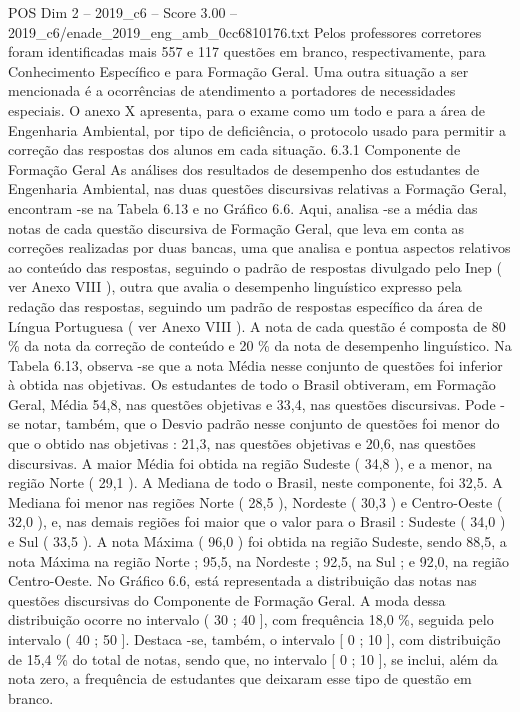 \begin{textsample}{POS Dim 2 – 2019\_c6 – Score 3.00 – 2019\_c6/enade\_2019\_eng\_amb\_0cc6810176.txt}
Pelos professores corretores foram identificadas mais 557 e 117 questões em branco, respectivamente, para Conhecimento Específico e para Formação Geral.
Uma outra situação a ser mencionada é a ocorrências de atendimento a portadores de necessidades especiais.
O anexo X apresenta, para o exame como um todo e para a área de Engenharia Ambiental, por tipo de deficiência, o protocolo usado para permitir a correção das respostas dos alunos em cada situação. 6.3.1 Componente de Formação Geral As análises dos resultados de desempenho dos estudantes de Engenharia Ambiental, nas duas questões discursivas relativas a Formação Geral, encontram -se na Tabela 6.13 e no Gráfico 6.6.
Aqui, analisa -se a média das notas de cada questão discursiva de Formação Geral, que leva em conta as correções realizadas por duas bancas, uma que analisa e pontua aspectos relativos ao conteúdo das respostas, seguindo o padrão de respostas divulgado pelo Inep ( ver Anexo VIII ), outra que avalia o desempenho linguístico expresso pela redação das respostas, seguindo um padrão de respostas específico da área de Língua Portuguesa ( ver Anexo VIII ).
A nota de cada questão é composta de 80 \% da nota da correção de conteúdo e 20 \% da nota de desempenho linguístico.
Na Tabela 6.13, observa -se que a nota Média nesse conjunto de questões foi inferior à obtida nas objetivas.
Os estudantes de todo o Brasil obtiveram, em Formação Geral, Média 54,8, nas questões objetivas e 33,4, nas questões discursivas.
Pode -se notar, também, que o Desvio padrão nesse conjunto de questões foi menor do que o obtido nas objetivas : 21,3, nas questões objetivas e 20,6, nas questões discursivas.
A maior Média foi obtida na região Sudeste ( 34,8 ), e a menor, na região Norte ( 29,1 ).
A Mediana de todo o Brasil, neste componente, foi 32,5.
A Mediana foi menor nas regiões Norte ( 28,5 ), Nordeste ( 30,3 ) e Centro-Oeste ( 32,0 ), e, nas demais regiões foi maior que o valor para o Brasil : Sudeste ( 34,0 ) e Sul ( 33,5 ).
A nota Máxima ( 96,0 ) foi obtida na região Sudeste, sendo 88,5, a nota Máxima na região Norte ; 95,5, na Nordeste ; 92,5, na Sul ; e 92,0, na região Centro-Oeste.
No Gráfico 6.6, está representada a distribuição das notas nas questões discursivas do Componente de Formação Geral.
A moda dessa distribuição ocorre no intervalo ( 30 ; 40 ], com frequência 18,0 \%, seguida pelo intervalo ( 40 ; 50 ].
Destaca -se, também, o intervalo [ 0 ; 10 ], com distribuição de 15,4 \% do total de notas, sendo que, no intervalo [ 0 ; 10 ], se inclui, além da nota zero, a frequência de estudantes que deixaram esse tipo de questão em branco.

\end{textsample}

